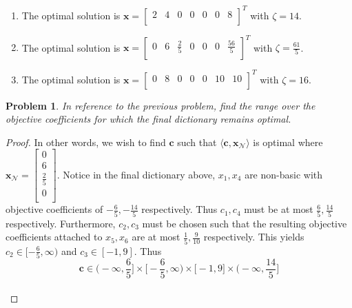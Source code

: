 \documentclass[12pt,oneside]{amsart}
\numberwithin{equation}{section}
\numberwithin{figure}{section}
\theoremstyle{plain}
\newtheorem{prob}{Problem}
\theoremstyle{definition}
\begin{document}
\begin{enumerate}
  \item The optimal solution is $\mathbf{x} = \begin{bmatrix} 
      2 & 4 & 0 & 0 & 0 & 0 & 8 \\
    \end{bmatrix}^T$ with $\zeta = 14$. \\
  \item The optimal solution is $\mathbf{x} = \begin{bmatrix}
      0 & 6 & \frac{2}{5} & 0 & 0 & 0 & \frac{56}{5} \\
    \end{bmatrix}^T$ with $\zeta = \frac{61}{5}$. \\
  \item The optimal solution is $\mathbf{x} = \begin{bmatrix}
      0 & 8 & 0 & 0 & 0 & 10 & 10 \\
    \end{bmatrix}^T$ with $\zeta = 16$. \\
\end{enumerate}

\begin{prob}
In reference to the previous problem, find the range over the objective 
coefficients for which the final dictionary remains optimal. \\
\end{prob}
\begin{proof}
  In other words, we wish to find $\mathbf{c}$ such that $\langle \mathbf{c},
  \mathbf{x}_{\mathscr{N}} \rangle$ is optimal where $\mathbf{x}_{\mathscr{N}} = \begin{bmatrix}
    0 \\ 
    6 \\ 
    \frac{2}{5} \\ 
    0 \\ 
  \end{bmatrix}$. Notice in the final dictionary above, $x_1,x_4$ are non-basic 
  with objective coefficients of $-\frac{6}{5},-\frac{14}{5}$ respectively. Thus 
  $c_1,c_4$ must be at most $\frac{6}{5},\frac{14}{5}$ respectively. Furthermore, 
  $c_2,c_3$ must be chosen such that the resulting objective coefficients 
  attached to $x_5,x_6$ are at most $\frac{1}{5},\frac{9}{10}$ respectively. This 
  yields $c_2 \in [-\frac{6}{5},\infty)$ and $c_3 \in [-1,9]$. Thus \\
  \[\mathbf{c} \in \bigg(-\infty,\frac{6}{5}\bigg] \times \bigg[-\frac{6}{5},
    \infty\bigg) \times \bigg[-1,9\bigg] \times \bigg(-\infty,\frac{14}{5}\bigg]\] \\
\end{proof}
\end{document}
